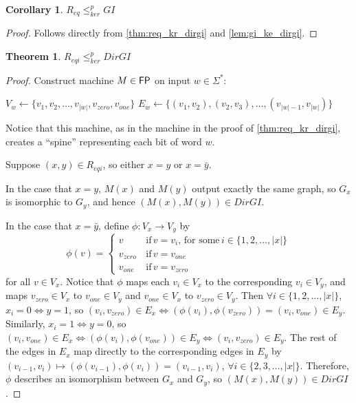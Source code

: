 \documentclass[draft]{article}
\newtheorem{theorem}{Theorem}%
\newtheorem{corollary}{Corollary}%
\theoremstyle{definition}
\newcommand{\plain}[1]{\,\text{#1}\,} %
\newcommand{\sigmastar}{\Sigma^{*}}
\newcommand{\kr}{\leq^{p}_{ker}} %
\begin{document}
\begin{corollary}$R_{eq}\kr GI$\end{corollary}
\begin{proof}Follows directly from \autoref{thm:req_kr_dirgi} and
  \autoref{lem:gi_ke_dirgi}.\end{proof}

\begin{theorem}\label{thm:reqi_kr_dirgi}$R_{eqi}\kr DirGI$\end{theorem}
\begin{proof}
  Construct machine $M\in {\ensuremath{\mathsf{FP}}}$ on input $w\in\sigmastar$:\\
  \begin{algorithm}[H]
    $V_w\gets\{v_1, v_2, \ldots, v_{|w|}, v_{zero}, v_{one}\}$\;
    $E_w\gets\{(v_1, v_2), (v_2, v_3), \ldots, (v_{|w|-1},
    v_{|w|})\}$\;
  \end{algorithm}
  Notice that this machine, as in the machine in the proof of
  \autoref{thm:req_kr_dirgi}, creates a ``spine'' representing each bit of word
  $w$.

  Suppose $(x, y)\in R_{eqi}$, so either $x=y$ or $x=\bar{y}$.

  In the case that $x=y$, $M(x)$ and $M(y)$ output exactly the same graph, so
  $G_x$ is isomorphic to $G_y$, and hence $(M(x), M(y))\in DirGI$.

  In the case that $x=\bar{y}$, define $\phi:V_x\to V_y$ by
  \begin{displaymath}
    \phi(v)=
    \begin{cases}
      v & \plain{if} v = v_i, \plain{for some} i\in\{1, 2, \ldots, |x|\}\\
      v_{zero} & \plain{if} v = v_{one}\\
      v_{one} & \plain{if} v = v_{zero}
    \end{cases}
  \end{displaymath}
  for all $v\in V_x$. Notice that $\phi$ maps each $v_i\in V_x$ to the
  corresponding $v_i\in V_y$, and maps $v_{zero}\in V_x$ to $v_{one}\in V_y$
  and $v_{one}\in V_x$ to $v_{zero}\in V_y$. Then $\forall
  i\in\{1,2,\ldots,|x|\}$, $x_i=0 \iff y=1$, so $(v_i, v_{zero})\in E_x \iff
  (\phi(v_i), \phi(v_{zero})) = (v_i, v_{one})\in E_y$. Similarly, $x_i=1 \iff
  y=0$, so $(v_i, v_{one})\in E_x \iff (\phi(v_i), \phi(v_{one}))\in E_y \iff
  (v_i, v_{zero})\in E_y$. The rest of the edges in $E_x$ map directly to the
  corresponding edges in $E_y$ by $(v_{i-1}, v_i) \mapsto (\phi(v_{i-1}),
  \phi(v_i))=(v_{i-1}, v_i)$, $\forall i\in\{2,3,\ldots,|x|\}$. Therefore,
  $\phi$ describes an isomorphism between $G_x$ and $G_y$, so $(M(x), M(y))\in
  DirGI$.


\end{proof}
\end{document}
